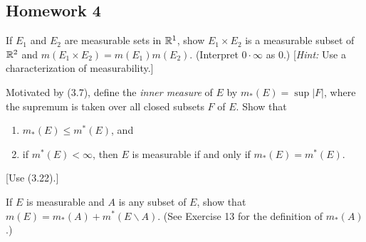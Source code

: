 \subsection{Homework 4}

\begin{problem}
  If $E_1$ and $E_2$ are measurable sets in $\mathbb{R}^1$, show $E_1\times E_2$
  is a measurable subset of $\mathbb{R}^2$ and $m(E_1\times
  E_2)=m(E_1)m(E_2)$. (Interpret $0\cdot\infty$ as $0$.) [\emph{Hint:} Use
  a characterization of measurability.]
\end{problem}
\begin{solution}
\end{solution}

\begin{problem}
  Motivated by (3.7), define the \emph{inner measure} of $E$ by
  $m_*(E)=\sup|F|$, where the supremum is taken over all closed subsets $F$
  of $E$. Show that
\begin{enumerate}[label=(\roman*),noitemsep]
\item $m_*(E)\leq m^*(E)$, and
\item if $m^*(E)<\infty$, then $E$ is measurable if and only if
  $m_*(E)=m^*(E)$.
\end{enumerate}
[Use (3.22).]
\end{problem}
\begin{solution}
\end{solution}

\begin{problem}
  If $E$ is measurable and $A$ is any subset of $E$, show that
  $m(E)=m_*(A)+m^*(E\smallsetminus A)$. (See Exercise 13 for the definition
  of $m_*(A)$.)
\end{problem}
\begin{solution}
\end{solution}

